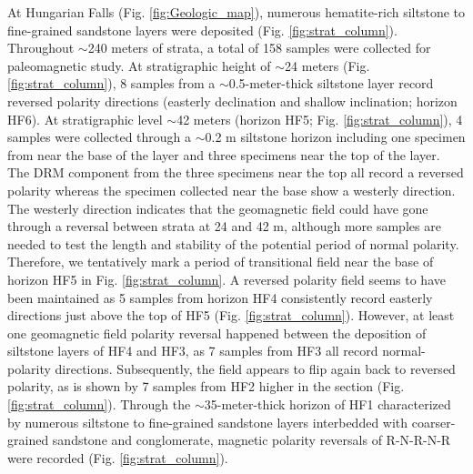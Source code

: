\documentclass[draft]{agujournal2019}
\begin{document}
At Hungarian Falls (Fig. \ref{fig:Geologic_map}), numerous hematite-rich siltstone to fine-grained sandstone layers were deposited (Fig. \ref{fig:strat_column}). Throughout $\sim$240 meters of strata, a total of 158 samples were collected for paleomagnetic study. At stratigraphic height of $\sim$24 meters (Fig. \ref{fig:strat_column}), 8 samples from a $\sim$0.5-meter-thick siltstone layer record reversed polarity directions (easterly declination and shallow inclination; horizon HF6). At stratigraphic level $\sim$42 meters (horizon HF5; Fig. \ref{fig:strat_column}), 4 samples were collected through a $\sim$0.2 m siltstone horizon including one specimen from near the base of the layer and three specimens near the top of the layer. The DRM component from the three specimens near the top all record a reversed polarity whereas the specimen collected near the base show a westerly direction. The westerly direction indicates that the geomagnetic field could have gone through a reversal between strata at 24 and 42 m, although more samples are needed to test the length and stability of the potential period of normal polarity. Therefore, we tentatively mark a period of transitional field near the base of horizon HF5 in Fig. \ref{fig:strat_column}. A reversed polarity field seems to have been maintained as 5 samples from horizon HF4 consistently record easterly directions just above the top of HF5 (Fig. \ref{fig:strat_column}). However, at least one geomagnetic field polarity reversal happened between the deposition of siltstone layers of HF4 and HF3, as 7 samples from HF3 all record normal-polarity directions. Subsequently, the field appears to flip again back to reversed polarity, as is shown by 7 samples from HF2 higher in the section (Fig. \ref{fig:strat_column}). Through the $\sim$35-meter-thick horizon of HF1 characterized by numerous siltstone to fine-grained sandstone layers interbedded with coarser-grained sandstone and conglomerate, magnetic polarity reversals of R-N-R-N-R were recorded (Fig. \ref{fig:strat_column}). 
\end{document}
